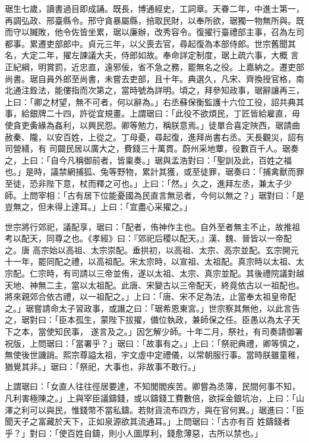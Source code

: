 \begin{pinyinscope}
 琚生七歲，讀書過目即成誦。既長，博通經史，工詞章。天眷二年，中進士第一，再調弘政、邢臺縣令。邢守貪暴屬縣，掊取民財，以奉所欲，琚獨一物無所與。既而守以贓敗，他令佐皆坐累，琚以廉辦，改秀容令。復擢行臺禮部主事，召為左司都事。累遷吏部郎中。貞元三年，以父喪去官，尋起復為本部侍郎。世宗舊聞其名，大定二年，擢左諫議大夫，侍郎如故。奉命詳定制度，琚上疏六事，大概
 言正紀綱，明賞罰，近忠直，遠邪佞，省不急之務，罷無名之役。上嘉納之。遷吏部尚書。琚自員外郎至尚書，未嘗去吏部，且十年。典選久，凡宋、齊換授官格，南北通注銓法，能僂指而次第之，當時號為詳明。頃之，拜參知政事，琚辭讓再三，上曰：「卿之材望，無不可者，何以辭為。」右丞蘇保衡監護十六位工役，詔共典其事，給銀牌二十四，許從宜規畫。上謂琚曰：「此役不欲煩民，丁匠皆給雇直，毋使貪吏夤緣為姦利，以興民怨。卿等勉力，稱朕意焉。」徒單合喜定陜西，琚請曲赦秦、隴，以安百姓，上從之。丁母憂，尋起復，進拜尚書右丞。天長觀災，詔有司營繕，有
 司闢民居以廣大之，費錢三十萬貫。蔚州采地蕈，役數百千人。琚奏之，上曰：「自今凡稱御前者，皆稟奏。」琚與孟浩對曰：「聖訓及此，百姓之福也。」是時，議禁網捕狐、兔等野物，累計其獲，或至徒罪，琚奏曰：「捕禽獸而罪至徒，恐非陛下意，杖而釋之可也。」上曰：「然。」久之，進拜左丞，兼太子少師。上問宰相：「古有居下位能憂國為民直言無忌者，今何以無之？」琚對曰：「是豈無之，但未得上達耳。」上曰：「宜盡心采擢之。」



 世宗將行郊祀，議配享，琚曰：「配者，侑神作主也。自外至者無主不止，故推祖考以配天，同尊之也。《孝經》曰：『郊祀后稷以配天。』漢、魏、晉皆以一帝配之。唐
 高宗始以高祖、太宗崇配。垂拱初，以高祖、太宗、高宗並配。玄宗開元十一年，罷同配之禮，以高祖配。宋太宗時，以宣祖、太祖配。真宗時以太祖、太宗配。仁宗時，有司請以三帝並侑，遂以太祖、太宗、真宗並配。其後禮院議對越天地、神無二主，當以太祖配。此唐、宋變古以三帝配天，終竟依古以一祖配也。將來親郊合依古禮，以一祖配之。」上曰：「唐、宋不足為法，止當奉太祖皇帝配之。」琚嘗請命太子習政事，或譖之曰：「琚希恩東宮。」世宗察其無他，以此言告之，琚對曰：「臣本孤生，蒙陛下拔擢，備位執政，兼師保之任。臣愚以為太子天下之本，當使知民事，
 遂言及之。」因乞解少師。十年二月，祭社，有司奏請御署祝版，上問琚曰：「當署乎？」琚曰：「故事有之。」上曰：「祭祀典禮，卿等慎之，無使後世譏誚。熙宗尊謚太祖，宇文虛中定禮儀，以常朝服行事。當時朕雖童稚，猶覺其非。」琚曰：「祭祀，大事也，非故事不敢行。」



 上謂琚曰：「女直人往往徑居要達，不知閭閻疾苦。卿嘗為丞簿，民間何事不知，凡利害極陳之。」上與宰臣議鑄錢，或以鑄錢工費數倍，欲採金銀坑冶，上曰：「山澤之利可以與民，惟錢幣不當私鑄。若財貨流布四方，與在官何異。」琚進曰：「臣聞天子之富藏於天下，正如泉源欲其流通耳。」上問琚曰：「古亦有百
 姓鑄錢者乎？」對曰：「使百姓自鑄，則小人圖厚利，錢愈薄惡，古所以禁也。」




\end{pinyinscope}
